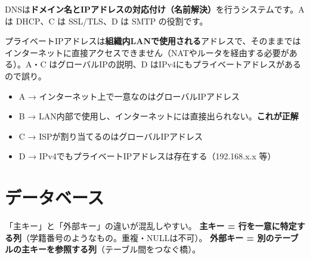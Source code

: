 \kaitoupage


\begin{kaisetsu}
DNSは\textbf{ドメイン名とIPアドレスの対応付け（名前解決）}を行うシステムです。A は DHCP、C は SSL/TLS、D は SMTP の役割です。
\end{kaisetsu}


\begin{kaisetsu}
プライベートIPアドレスは\textbf{組織内LANで使用される}アドレスで、そのままではインターネットに直接アクセスできません（NATやルータを経由する必要がある）。A・C はグローバルIPの説明、D はIPv4にもプライベートアドレスがあるので誤り。
\end{kaisetsu}

\begin{goutoubun}
\begin{itemize}
  \item A → インターネット上で一意なのはグローバルIPアドレス
  \item B → LAN内部で使用し、インターネットには直接出られない。\textbf{これが正解}
  \item C → ISPが割り当てるのはグローバルIPアドレス
  \item D → IPv4でもプライベートIPアドレスは存在する（192.168.x.x 等）
\end{itemize}
\end{goutoubun}




\section{データベース}

\mondaipage
{}

\begin{stumble}
「主キー」と「外部キー」の違いが混乱しやすい。
\textbf{主キー = 行を一意に特定する列}（学籍番号のようなもの。重複・NULLは不可）。
\textbf{外部キー = 別のテーブルの主キーを参照する列}（テーブル間をつなぐ橋）。
\end{stumble}

